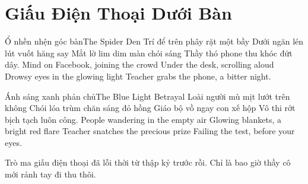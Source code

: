 \chapter{Giấu Điện Thoại Dưới Bàn}

\begin{tutuyetbox}{Ổ nhền nhện góc bàn}{The Spider Den}
Trí để trên phây rặt một bầy
Dưới ngăn lén lút vuốt hăng say
Mắt lờ lim dim màn chói sáng
Thầy thó phone thu khóc đứt dây.
\tcblower
Mind on Facebook, joining the crowd 
Under the desk, scrolling aloud 
Drowsy eyes in the glowing light 
Teacher grabs the phone, a bitter night.
\end{tutuyetbox}

\begin{tutuyetbox}{Ánh sáng xanh phản chủ}{The Blue Light Betrayal}
Loài người mù mịt lướt trên không
Chói lóa trùm chăn sáng đỏ hồng
Giáo bộ vồ ngay con xế hộp
Vô thi rớt bịch tạch luôn công.
\tcblower
People wandering in the empty air 
Glowing blankets, a bright red flare 
Teacher snatches the precious prize 
Failing the test, before your eyes.
\end{tutuyetbox}

\begin{ghichu}
Trò ma giấu điện thoại đã lỗi thời từ thập kỷ trước rồi. Chỉ là bao giờ thầy cô mới rảnh tay đi thu thôi.
\end{ghichu}